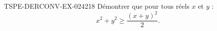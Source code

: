 \begin{exercice}{TSPE-DERCONV-EX-024}{2}{18}
Démontrer que pour tous réels $x$ et $y$ :
\[ x^2 + y^2 \geq \frac{(x+y)^2}{2}. \]

\end{exercice}
